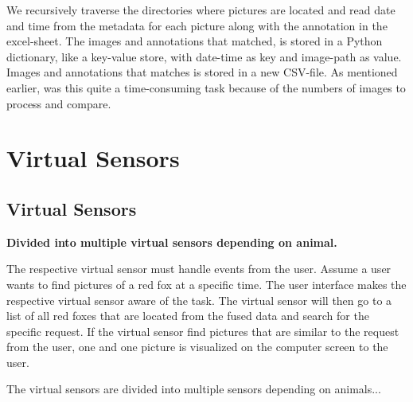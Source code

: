 \documentclass[USenglish]{uit-thesis}
\begin{document}
We recursively traverse the directories where pictures are located and read date and time from the metadata for each picture along with the annotation in the excel-sheet. The images and annotations that matched, is stored in a Python dictionary, like a key-value store, with date-time as key and image-path as value. Images and annotations that matches is stored in a new CSV-file.
As mentioned earlier, was this quite a time-consuming task because of the numbers of images to process and compare.




\section{Virtual Sensors}



\subsection{Virtual Sensors} \label{ssec:des_vs}
\textbf{Divided into multiple virtual sensors depending on animal.}

The respective virtual sensor must handle events from the user. Assume a user wants to find pictures of a red fox at a specific time.  The user interface makes the respective virtual sensor aware of the task. The virtual sensor will then go to a list of all red foxes that are located from the fused data and search for the specific request. If the virtual sensor find pictures that are similar to the request from the user, one and one picture is visualized on the computer screen to the user.

The virtual sensors are divided into multiple sensors depending on animals...
\end{document}
